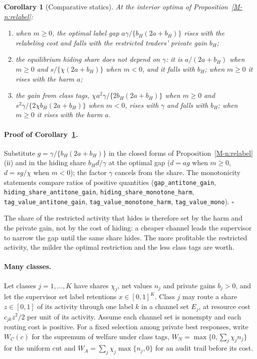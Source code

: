 \documentclass[12pt]{article}
\newtheorem{corollary}[theorem]{Corollary}
\theoremstyle{definition}
\theoremstyle{remark}
\begin{document}
\begin{corollary}[Comparative statics]\label{cor:relabelstatics}
At the interior optima of Proposition~\ref{M-n:relabel}:
\begin{enumerate}[label=(\roman*),itemsep=1pt]
\item when $m\ge0$, the optimal label gap $a\gamma/\{b_H(2a+b_H)\}$ rises with the relabeling cost and falls with the restricted traders' private gain $b_H$;
\item the equilibrium hiding share does not depend on $\gamma$: it is $a/(2a+b_H)$ when $m\ge0$ and $s/\{\chi(2a+b_H)\}$ when $m<0$, and it falls with $b_H$; when $m\ge0$ it rises with the harm $a$;
\item the gain from class tags, $\chi a^2\gamma/\{2b_H(2a+b_H)\}$ when $m\ge0$ and $s^2\gamma/\{2\chi b_H(2a+b_H)\}$ when $m<0$, rises with $\gamma$ and falls with $b_H$; when $m\ge0$ it rises with the harm $a$.
\end{enumerate}
\end{corollary}

\paragraph{Proof of Corollary~\ref{cor:relabelstatics}.} Substitute $g=\gamma/\{b_H(2a+b_H)\}$ in the closed forms of Proposition~\ref{M-n:relabel}(ii) and in the hiding share $b_Hd/\gamma$ at the optimal gap ($d=ag$ when $m\ge0$, $d=sg/\chi$ when $m<0$); the factor $\gamma$ cancels from the share. The monotonicity statements compare ratios of positive quantities (\nolinkurl{gap_antitone_gain}, \nolinkurl{hiding_share_antitone_gain}, \nolinkurl{hiding_share_monotone_harm}, \nolinkurl{tag_value_antitone_gain}, \nolinkurl{tag_value_monotone_harm}, \nolinkurl{tag_value_mono}). $\square$

The share of the restricted activity that hides is therefore set by the harm and the private gain, not by the cost of hiding: a cheaper channel leads the supervisor to narrow the gap until the same share hides. The more profitable the restricted activity, the milder the optimal restriction and the less class tags are worth.

\paragraph{Many classes.} Let classes $j=1,\ldots,K$ have shares $\chi_j$, net values $n_j$ and private gains $b_j>0$, and let the supervisor set label retentions $x\in[0,1]^K$. Class $j$ may route a share $z\in[0,1]$ of its activity through one label $k$ in a channel set $E_j$, at resource cost $c_{jk}z^2/2$ per unit of its activity. Assume each channel set is nonempty and each routing cost is positive. For a fixed selection among private best responses, write $W_C(c)$ for the supremum of welfare under class tags, $W_N=\max\{0,\sum_j\chi_jn_j\}$ for the uniform cut and $W_A=\sum_j\chi_j\max\{n_j,0\}$ for an audit trail before its cost.
\end{document}
